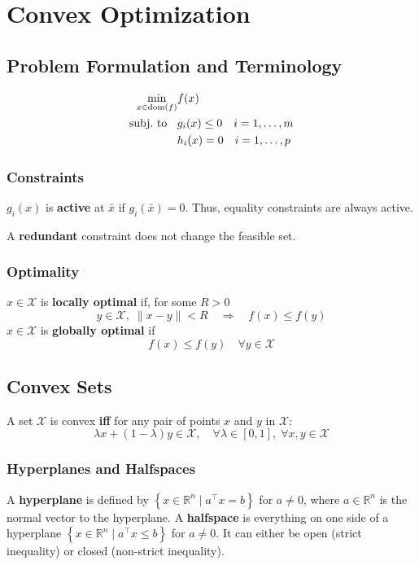 \section{Convex Optimization}
\subsection{Problem Formulation and Terminology}
\noindent\begin{align*}
    \min_{x\in\mathrm{dom}(f)} & f(x)                          \\
    \text{subj.\ to\;\; }      & g_i(x)\leq0\quad i=1,\ldots,m \\
                               & h_{i}(x)=0\quad i=1,\ldots,p
\end{align*}
\subsubsection{Constraints}
$g_i(x)$ is \textbf{active} at $\bar{x}$ if $g_i(\bar{x})=0$. Thus, equality constraints are always active.

\newpar{}
A \textbf{redundant} constraint does not change the feasible set.

\subsubsection{Optimality}
$x\in \mathcal{X}$ is \textbf{locally optimal} if, for some $R>0$
\begin{equation*}
    y\in \mathcal{X},\; {\|x-y\|}<R\quad \Rightarrow\quad f(x)\leq f(y)
\end{equation*}
$x\in \mathcal{X}$ is \textbf{globally optimal} if
\begin{equation*}
    f(x)\leq f(y)\quad \forall y\in \mathcal{X}
\end{equation*}

\subsection{Convex Sets}
A set $\mathcal{X}$ is convex \textbf{iff} for any pair of points $x$ and $y$ in $\mathcal{X}$:
\begin{equation*}
    \lambda x+(1-\lambda)y\in\mathcal{X}, \quad\forall\lambda\in[0,1],\;\forall x,y\in\mathcal{X}
\end{equation*}

\subsubsection{Hyperplanes and Halfspaces}
A \textbf{hyperplane} is defined by $\left\{x \in \mathbb{R}^n \mid a^\top x = b\right\}$ for $a \neq 0$, where $a \in \mathbb{R}^n$ is the normal vector to the hyperplane.
\newpar{}
A \textbf{halfspace} is everything on one side of a hyperplane $\left\{x \in \mathbb{R}^n \mid a^\top x \leq b\right\}$ for $a \neq 0$. It can either be open (strict inequality) or closed (non-strict inequality).

